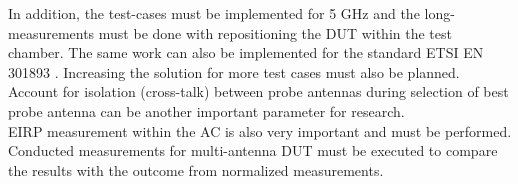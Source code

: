  In addition, the test-cases must be implemented for 5 GHz and the long-measurements must be done with repositioning the \acs{DUT} within the test chamber. The same work can also be implemented for the standard ETSI EN 301893 \cite{etsi301893}. Increasing the solution for more test cases must also be planned.  Account for isolation (cross-talk) between probe antennas during selection of best probe antenna can be another important parameter for research. \\
 
 \acs{EIRP} measurement within the \acf{AC} is also very important and must be performed. Conducted measurements for multi-antenna \acs{DUT} must be executed to compare the results with the outcome from normalized measurements. 


